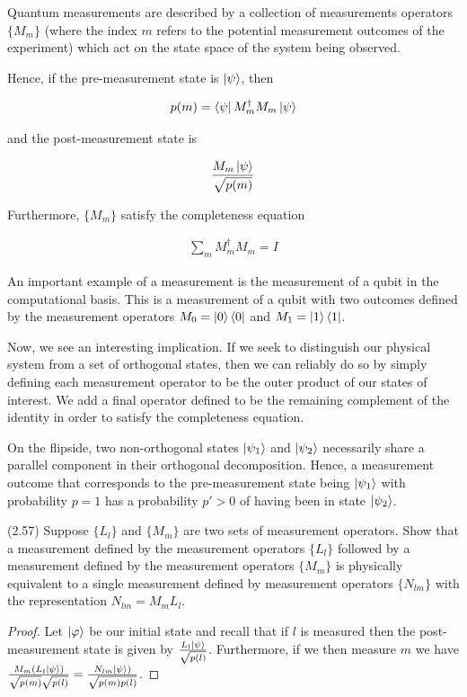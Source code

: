 \documentclass[main.tex]{subfiles}
\begin{document}
\begin{subappendices}
Quantum measurements are described by a collection of measurements operators $\{ M_m \}$ (where the index $m$ refers to the potential measurement outcomes of the experiment) which act on the state space of the system being observed. 

Hence, if the pre-measurement state is $\ket{\psi}$, then 

\begin{align*}
	p(m) = \bra{\psi} M_m^\dagger M_m \ket{\psi}
\end{align*}

and the post-measurement state is 

\begin{align*}
	\frac{M_m \ket{\psi}}{\sqrt{p(m)}}
\end{align*}

Furthermore, $\{ M_m \}$ satisfy the completeness equation

\begin{align*}
\sum_m M_m^\dagger M_m = I
\end{align*}

An important example of a measurement is the measurement of a qubit in the computational basis. This is a measurement of a qubit with two outcomes defined by the measurement operators $M_0 = \ket{0}\bra{0}$ and $M_1 = \ket{1}\bra{1}$.

Now, we see an interesting implication. If we seek to distinguish our physical system from a set of orthogonal states, then we can reliably do so by simply defining each measurement operator to be the outer product of our states of interest. We add a final operator defined to be the remaining complement of the identity in order to satisfy the completeness equation. 

On the flipside, two non-orthogonal states $\ket{\psi_1}$ and $\ket{\psi_2}$ necessarily share a parallel component in their orthogonal decomposition. Hence, a measurement outcome that corresponds to the pre-measurement state being $\ket{\psi_1}$ with probability $p = 1$ has a probability $p'>0$ of having been in state $\ket{\psi_2}$. 

\begin{exercise}
(2.57) Suppose $\{L_l\}$ and $\{M_m\}$ are two sets of measurement operators. Show that a measurement defined by the measurement operators $\{L_l \}$ followed by a measurement defined by the measurement operators $\{ M_m \}$ is physically equivalent to a single measurement defined by measurement operators $\{N_{lm}\}$ with the representation $N_{lm} = M_mL_l$.
\begin{proof}
Let $\ket{\varphi}$ be our initial state and recall that if $l$ is measured then the post-measurement state is given by $\frac{L_l \ket{\psi}}{\sqrt{p(l)}}$. Furthermore, if we then measure $m$ we have 	$\frac{M_m(L_l \ket{\psi})}{\sqrt{p(m)}\sqrt{p(l)}} = \frac{N_{lm} \ket{\psi})}{\sqrt{p(m)p(l)}}$. 


\end{proof}
\end{exercise}
\end{subappendices}
\end{document}
